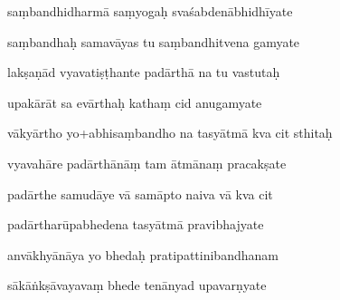 \documentclass[article,12pt,a4paper]{memoir}%
\newcounter{parCount}
\begin{document}
	  
	  \pstart {} saṃbandhidharmā saṃyogaḥ svaśabdenābhidhīyate 
	{}
	\pend%
      

	  
	  \pstart \leavevmode%
	saṃbandhaḥ samavāyas tu saṃbandhitvena gamyate 
	{}
	\pend%
      

	  
	  \pstart {} lakṣaṇād vyavatiṣṭhante padārthā na tu vastutaḥ 
	{}
	\pend%
      

	  
	  \pstart \leavevmode%
	upakārāt sa evārthaḥ kathaṃ cid anugamyate 
	{}
	\pend%
      

	  
	  \pstart {} vākyārtho yo+abhisaṃbandho na tasyātmā kva cit sthitaḥ 
	{}
	\pend%
      

	  
	  \pstart \leavevmode%
	vyavahāre padārthānāṃ tam ātmānaṃ pracakṣate 
	{}
	\pend%
      

	  
	  \pstart {} padārthe samudāye vā samāpto naiva vā kva cit 
	{}
	\pend%
      

	  
	  \pstart \leavevmode%
	padārtharūpabhedena tasyātmā pravibhajyate 
	{}
	\pend%
      

	  
	  \pstart {} anvākhyānāya yo bhedaḥ pratipattinibandhanam 
	{}
	\pend%
      

	  
	  \pstart \leavevmode%
	sākāṅkṣāvayavaṃ bhede tenānyad upavarṇyate 
	{}
	\pend%
      
\end{document}

